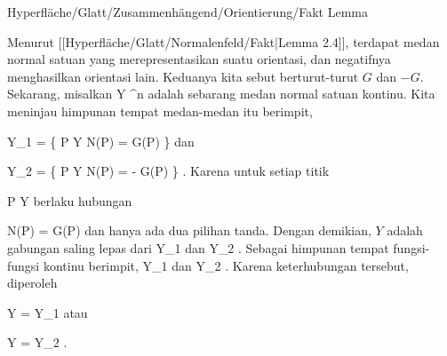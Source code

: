 {Hyperfläche/Glatt/Zusammenhängend/Orientierung/Fakt}
{Lemma}
{}
{

\faktzusatz {}
\faktzusatz {}

}
{

Menurut
[[Hyperfläche/Glatt/Normalenfeld/Fakt|Lemma 2.4]],
terdapat medan normal satuan yang merepresentasikan suatu orientasi, dan negatifnya menghasilkan orientasi lain. Keduanya kita sebut berturut-turut $G$ dan $-G$. Sekarang, misalkan
 { Y } { \R^n
} {}
adalah sebarang medan normal satuan kontinu. Kita meninjau himpunan tempat medan-medan itu berimpit,

\mavergleichskettedisp
{\vergleichskette
{ Y_1
}
{ =} { \left\{ P \in Y  \mid   N(P) = G(P)         \right\}
}
{ } {
}
{ } {
}
{ } {
}
}
{}{}{}
dan

\mavergleichskettedisp
{\vergleichskette
{ Y_2
}
{ =} { \left\{ P \in Y  \mid   N(P) = - G(P)         \right\}
}
{ } {
}
{ } {
}
{ } {
}
}
{}{}{.}
Karena untuk setiap titik

\mavergleichskette
{\vergleichskette
{ P
}
{ \in }{ Y
}
{  }{
}
{    }{
}
{   }{
}
}
{}{}{}
berlaku hubungan

\mavergleichskettedisp
{\vergleichskette
{ N(P)
}
{ =} { \pm G(P)
}
{ } {
}
{ } {
}
{ } {
}
}
{}{}{}
dan hanya ada dua pilihan tanda. Dengan demikian, $Y$ adalah gabungan saling lepas dari
\mathkor {} {Y_1} {dan} {Y_2} {.}
Sebagai himpunan tempat fungsi-fungsi kontinu berimpit,
\mathkor {} {Y_1} {dan} {Y_2} {}
 {} {.}
Karena keterhubungan tersebut, diperoleh

\mavergleichskette
{\vergleichskette
{ Y
}
{ = }{ Y_1
}
{  }{
}
{    }{
}
{   }{
}
}
{}{}{}
atau

\mavergleichskette
{\vergleichskette
{ Y
}
{ = }{ Y_2
}
{  }{
}
{    }{
}
{   }{
}
}
{}{}{.}

}

